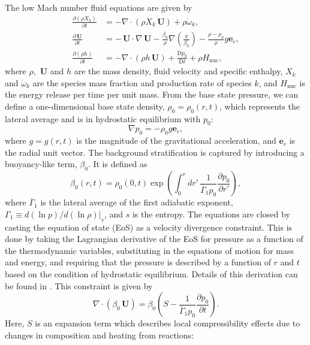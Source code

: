 \documentclass[a4paper]{jpconf}
\newcommand{\Ub}{{\,\bm{U}}}
\newcommand{\pd}[2]{\frac{\partial #1}{\partial #2}}
\newcommand{\md}[2]{\frac{\mathrm{D} #1}{\mathrm{D} #2}}
\begin{document}
The low Mach number fluid equations are given by 
\begin{align}
    \pd{\left(\rho X_k\right)}{t} &= - \nabla\cdot\left(\rho X_k \Ub \right) + \rho\dot{\omega}_k, \\
    \pd{\Ub}{t} &= - \Ub\cdot\nabla\Ub - \frac{\beta_0}{\rho}\nabla\left(\frac{\pi}{\beta_0}\right) - \frac{\rho - \rho_0}{\rho} g \bm{e}_r,\\
    \pd{\left(\rho h\right)}{t} &= -\nabla\cdot\left(\rho h \Ub\right) + \md{p_0}{t} + \rho H_{\mathrm{nuc}},
\end{align}
where $\rho$, $\Ub$ and $h$ are the mass density, fluid velocity and specific enthalpy, $X_k$ and $\dot{\omega}_k$ are the species mass fraction and production rate of species $k$, and $H_{\mathrm{nuc}}$ is the energy release per time per unit mass. From the base state pressure, we can define a one-dimensional base state density, $\rho_0 = \rho_0(r, t)$, which represents the lateral average and is in hydrostatic equilibrium with $p_0$:
\begin{equation}
    \nabla p_0 = -\rho_0 g \bm{e}_r,
\end{equation}
where $g = g(r,t)$ is the magnitude of the gravitational acceleration, and $\bm{e}_r$ is the radial unit vector. The background stratification is captured by introducing a buoyancy-like term, $\beta_0$. It is defined as 
\begin{equation}
    \beta_0(r,t) = \rho_0(0,t) \exp\left(\int_0^r dr'\, \frac{1}{\overline{\Gamma}_1p_0}\pd{p_0}{r'} \right),
\end{equation}
where $\overline{\Gamma}_1$ is the lateral average of the first adiabatic exponent, $\Gamma_1 \equiv d(\ln p)/d(\ln \rho)|_s$, and $s$ is the entropy. The equations are closed by casting the equation of state (EoS) as a velocity divergence constraint. This is done by taking the Lagrangian derivative of the EoS for pressure as a function of the thermodynamic variables, substituting in the equations of motion for mass and energy, and requiring that the pressure is described by a function of $r$ and $t$ based on the condition of hydrostatic equilibrium. Details of this derivation can be found in \cite{Almgren2006a,Almgren2006b}. This constraint is given by 
\begin{equation}
    \nabla\cdot\left(\beta_0\Ub\right) = \beta_0 \left(S - \frac{1}{\overline{\Gamma}_1 p_0}\pd{p_0}{t} \right).
\end{equation}
Here, $S$ is an expansion term which describes local compressibility effects due to changes in composition and heating from reactions:
\end{document}
